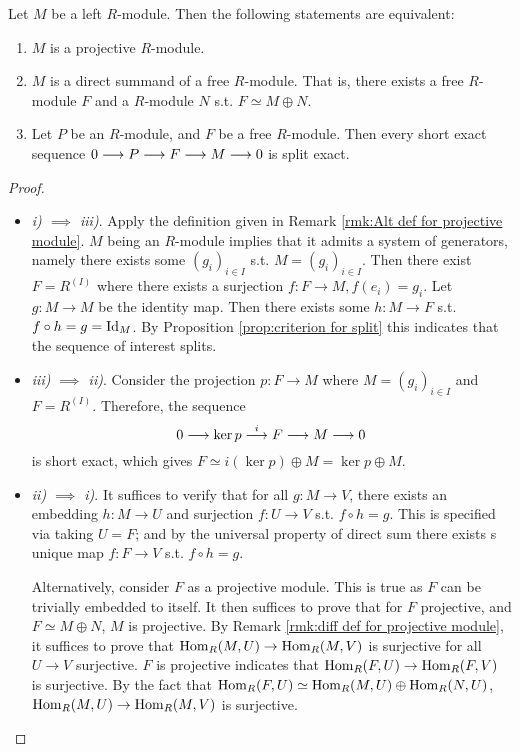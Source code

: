\documentclass{article}
\begin{document}
\begin{proposition}\label{prop:criterion for projective module}
    Let $M$ be a left $R$-module. Then the following statements are equivalent:
    \begin{enumerate}[label=\roman*)]
        \item $M$ is a projective $R$-module.
        \item $M$ is a direct summand of a free $R$-module. That is, there exists a free $R$-module $F$ and a $R$-module $N$ s.t. $F \simeq M \oplus N$.
        \item Let $P$ be an $R$-module, and $F$ be a free $R$-module. Then every short exact sequence $0 \longrightarrow P \longrightarrow F \longrightarrow M \longrightarrow 0$ is split exact.
    \end{enumerate}
\end{proposition}

\begin{proof}\ 
    \begin{itemize}
        \item \emph{i) $\implies$ iii)}. Apply the definition given in Remark \ref{rmk:Alt def for projective module}. $M$ being an $R$-module implies that it admits a system of generators, namely there exists some $(g_i)_{i\in I}$ s.t. $M = (g_i)_{i\in I}$. Then there exist $F = R^{(I)}$ where there exists a surjection $f: F \to M, f(e_i) = g_i$. Let $g: M \to M$ be the identity map. Then there exists some $h: M \to F$ s.t. $f \circ h = g = \mathrm{Id}_M$. By Proposition \ref{prop:criterion for split} this indicates that the sequence of interest splits.
        \item \emph{iii) $\implies$ ii)}. Consider the projection $p: F \to M$ where $M = (g_i)_{i\in I}$ and $F = R^{(I)}$. Therefore, the sequence
        \[
            0 \longrightarrow \ker p \overset{i}{\longrightarrow} F \longrightarrow M \longrightarrow 0
        \]
        is short exact, which gives $F \simeq i(\ker p) \oplus M = \ker p \oplus M$.
        \item \emph{ii) $\implies$ i)}. It suffices to verify that for all $g: M \to V$, there exists an embedding $h: M \to U$ and surjection $f: U \to V$ s.t. $f \circ h = g$. This is specified via taking $U = F$; and by the universal property of direct sum there exists s unique map $f: F \to V$ s.t. $f \circ h = g$. 
        
        Alternatively, consider $F$ as a projective module. This is true as $F$ can be trivially embedded to itself. It then suffices to prove that for $F$ projective, and $F \simeq M \oplus N$, $M$ is projective. By Remark \ref{rmk:diff def for projective module}, it suffices to prove that $\mathrm{Hom}_R(M, U) \to \mathrm{Hom}_R(M, V)$ is surjective for all $U \to V$ surjective. $F$ is projective indicates that $\mathrm{Hom}_R(F, U) \to \mathrm{Hom}_R(F, V)$ is surjective. By the fact that $\mathrm{Hom}_R(F, U) \simeq \mathrm{Hom}_R(M, U) \oplus \mathrm{Hom}_R(N, U)$, $\mathrm{Hom}_R(M, U) \to \mathrm{Hom}_R(M, V)$ is surjective.
    \end{itemize}
\end{proof}
\end{document}
